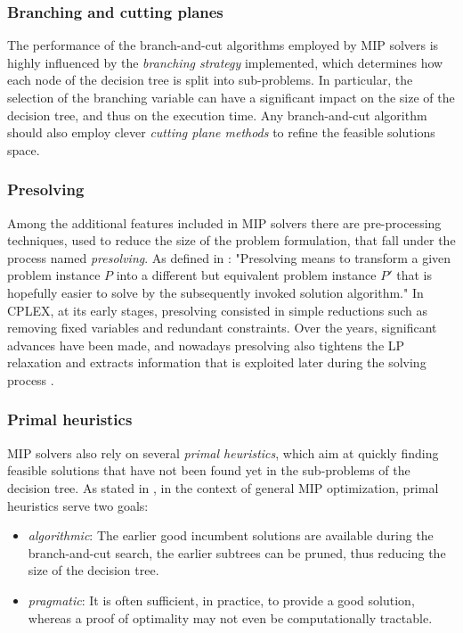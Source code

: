\documentclass[a4paper,12pt,twoside]{scrbook}
\begin{document}
\subsubsection{Branching and cutting planes}
The performance of the branch-and-cut algorithms employed by MIP solvers is highly influenced by the \textit{branching strategy} implemented, which determines how each node of the decision tree is split into sub-problems. In particular, the selection of the branching variable can have a significant impact on the size of the decision tree, and thus on the execution time.
Any branch-and-cut algorithm should also employ clever \textit{cutting plane methods} to refine the feasible solutions space. \par 

\subsubsection{Presolving}
Among the additional features included in MIP solvers there are pre-processing techniques, used to reduce the size of the problem formulation, that fall under the process named \textit{presolving}.
As defined in \cite{achterberg2013}:
	"Presolving means to transform a given problem instance $P$ into a
	different but equivalent problem instance $P'$ that is hopefully easier to solve by the subsequently invoked solution algorithm."
In CPLEX, at its early stages, presolving consisted in simple reductions such as removing fixed variables and redundant constraints. Over the years, significant advances have been made, and nowadays presolving also tightens the LP relaxation and extracts information that is exploited later during the solving process \cite{achterberg2013}. \par 

\subsubsection{Primal heuristics}
MIP solvers also rely on several \textit{primal heuristics}, which aim at quickly finding feasible solutions that have not been found yet in the sub-problems of the decision tree.
As stated in \cite{achterberg2013}, in the context of general MIP optimization, primal heuristics serve two goals:
\begin{itemize}
	\item \textit{algorithmic}: The earlier good incumbent solutions are available during the branch-and-cut search, the earlier subtrees can be pruned, thus reducing the size of the decision tree.
	\item \textit{pragmatic}: It is often sufficient, in practice, to provide a good solution, whereas a proof of optimality may not even be computationally tractable.
\end{itemize}
\end{document}
